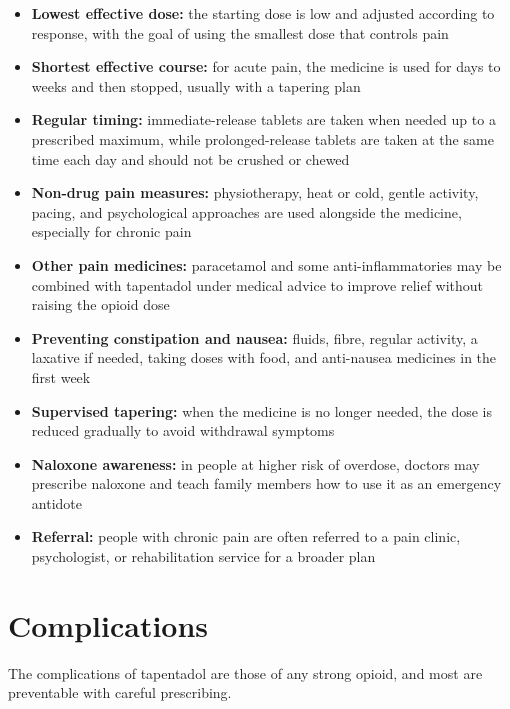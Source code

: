 \begin{itemize}
    \item \textbf{Lowest effective dose:} the starting dose is low and adjusted according to response, with the goal of using the smallest dose that controls pain
    \item \textbf{Shortest effective course:} for acute pain, the medicine is used for days to weeks and then stopped, usually with a tapering plan
    \item \textbf{Regular timing:} immediate-release tablets are taken when needed up to a prescribed maximum, while prolonged-release tablets are taken at the same time each day and should not be crushed or chewed
    \item \textbf{Non-drug pain measures:} physiotherapy, heat or cold, gentle activity, pacing, and psychological approaches are used alongside the medicine, especially for chronic pain
    \item \textbf{Other pain medicines:} paracetamol and some anti-inflammatories may be combined with tapentadol under medical advice to improve relief without raising the opioid dose
    \item \textbf{Preventing constipation and nausea:} fluids, fibre, regular activity, a laxative if needed, taking doses with food, and anti-nausea medicines in the first week
    \item \textbf{Supervised tapering:} when the medicine is no longer needed, the dose is reduced gradually to avoid withdrawal symptoms
    \item \textbf{Naloxone awareness:} in people at higher risk of overdose, doctors may prescribe naloxone and teach family members how to use it as an emergency antidote
    \item \textbf{Referral:} people with chronic pain are often referred to a pain clinic, psychologist, or rehabilitation service for a broader plan
\end{itemize}

\section*{Complications}
The complications of tapentadol are those of any strong opioid, and most are preventable with careful prescribing.

